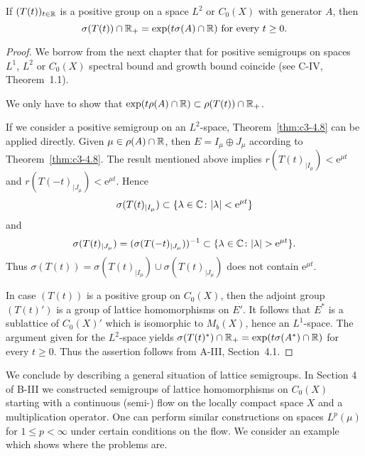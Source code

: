 \begin{corollary}\label{cor:c3-4.10}
If $(T(t))_{t \in \mathbb{R} }$ is a positive group on a space $L^2$ or
$C_0(X)$ with generator $A$, then
\begin{equation}\label{eq:c3-4.11}
	\sigma(T(t)) \cap \mathbb{R} _+ = \exp(t\sigma(A) \cap \mathbb{R} ) \  \text{for every} \  t \geq 0 .
\end{equation}
\end{corollary}
\begin{proof} 
We borrow from the next chapter that for positive semigroups on
spaces $L^1$, $L^2$ or $C_0(X)$ spectral bound and growth bound coincide
(see C-IV, Theorem~1.1).

We only have to show that $\exp(t\rho(A) \cap \mathbb{R} ) \subset \rho(T(t)) \cap \mathbb{R} _+$.

If we consider a positive semigroup on an $L^2$-space, Theorem~\ref{thm:c3-4.8} can be
applied directly. Given $\mu \in \rho(A) \cap \mathbb{R} $, then $E = I_{\mu} \oplus J_{\mu}$ according to
Theorem~\ref{thm:c3-4.8}. 
The result mentioned above implies 
$r(T(t)_{|I_{\mu}}) < \mathrm{e}^{\mu t}$ and
$r(T(-t)_{|J_{\mu}}) < \mathrm{e}^{\mu t}$. 
Hence 
%
\[
	\sigma(T(t)_{|I_{\mu}}) \subset \{\lambda \in \mathbb{C}  \colon |\lambda| < \mathrm{e}^{\mu t}\}
\]
and
\[
	\sigma(T(t)_{|J_{\mu}}) = (\sigma(T(-t)_{|J_{\mu}}))^{-1} 
		\subset \{\lambda \in \mathbb{C}  \colon |\lambda| > \mathrm{e}^{\mu t}\}.
\]
%
Thus $\sigma(T(t)) = \sigma(T(t)_{|I_{\mu}}) \cup \sigma(T(t)_{|J_{\mu}})$ does not contain $\mathrm{e}^{\mu t}$.

In case $(T(t))$ is a positive group on $C_0(X)$, then the adjoint
group $(T(t)')$ is a group of lattice homomorphisms on $E'$. It
follows that $E^*$ is a sublattice of $C_0(X)'$ which is isomorphic to $M_b(X)$, hence an
$L^1$-space. 
The argument given for the $L^2$-space yields
$\sigma(T(t)^*) \cap \mathbb{R} _+ = \exp(t\sigma(A^*) \cap \mathbb{R} )$ for every $t \geq 0$. 
Thus the assertion follows from A-III, Section~4.1.
\end{proof}

We conclude by describing a general situation of lattice semigroups. 
In Section 4 of B-III we constructed semigroups of lattice
homomorphisms on $C_0(X)$ starting with a continuous (semi-) flow on the
locally compact space $X$ and a multiplication operator. 
One can perform similar constructions on spaces $L^p(\mu)$ for $1 \leq p < \infty$ under
certain conditions on the flow. 
We consider an example which shows where the problems are.

